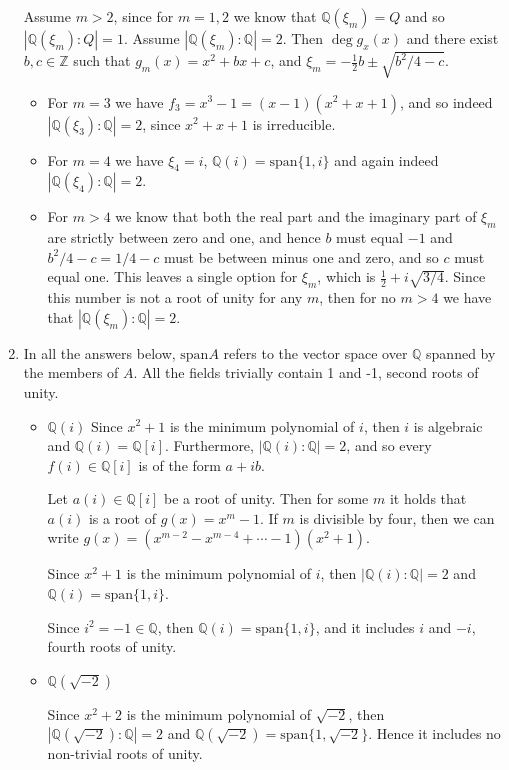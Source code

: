 \documentclass[11pt]{article} \usepackage{amssymb}
\newcommand{\Q}{\mathbb Q}
\newcommand{\Z}{\mathbb Z} \newcommand{\CalE}{{\mathcal{E}}}
\newcommand{\half}{{\textstyle \frac12}}
\begin{document}
\begin{enumerate}
  Assume $m>2$, since for $m=1,2$ we know that $\Q(\xi_m)=Q$ and so 
  $|\Q(\xi_m):Q|=1$.
  Assume $|\Q(\xi_m):\Q|=2$. Then $\deg g_x(x)$ and there exist $b,c \in \Z$ such that
  $g_m(x)=x^2+bx+c$, and $\xi_m=-\half b\pm \sqrt{b^2/4-c}$. 

  \begin{itemize}
  \item For $m=3$ we have $f_3=x^3-1=(x-1)(x^2+x+1)$, and so indeed 
    $|\Q(\xi_3):\Q|=2$, since $x^2+x+1$ is irreducible.
  \item For $m=4$ we have $\xi_4=i$, $\Q(i)=\mbox{span}\{1,i\}$ and again indeed
    $|\Q(\xi_4):\Q|=2$.
  \item For $m>4$ we know that both the real part and the imaginary part
    of $\xi_m$ are strictly between zero and one, and hence $b$ must equal $-1$
    and $b^2/4-c=1/4-c$ must be between minus one and zero, and so $c$
    must equal one. This leaves a single option for $\xi_m$, which is
    $\half+i\sqrt{3/4}$. Since this number is not a root of unity for any
    $m$, then for no $m>4$ we have that $|\Q(\xi_m):\Q|=2$.
  \end{itemize}

  \item 
    In all the answers below, $\mbox{span}A$ refers to the vector space
    over $\Q$ spanned by the members of $A$. All the fields trivially contain
    1 and -1, second roots of unity.
    \begin{itemize}
    \item $\Q(i)$
      Since $x^2+1$ is the minimum polynomial of  $i$, 
      then $i$ is algebraic and $\Q(i)=\Q[i]$. Furthermore, $|\Q(i):\Q|=2$, and so
      every $f(i) \in \Q[i]$ is of the form $a+ib$.

      Let $a(i) \in \Q[i]$ be a root of unity. Then for some $m$ it holds
      that $a(i)$ is a root of $g(x)=x^m-1$. If $m$ is divisible by four, then
      we can write $g(x)=(x^{m-2}-x^{m-4}+\cdots-1)(x^2+1)$. 
      
      Since $x^2+1$ is the minimum polynomial of  $i$, 
      then $|\Q(i):\Q|=2$ and $\Q(i)=\mbox{span}\{1,i\}$. 
      
      Since $i^2=-1\in \Q$, then $\Q(i)=\mbox{span}\{1,i\}$, and it includes 
      $i$ and $-i$, fourth roots of unity.
      
    \item $\Q(\sqrt{-2})$
      
      Since $x^2+2$ is the minimum polynomial of  $\sqrt{-2}$, 
      then $|\Q(\sqrt{-2}):\Q|=2$ and  $\Q(\sqrt{-2})=\mbox{span}\{1,\sqrt{-2}\}$. 
      Hence it includes no non-trivial roots of unity.


\end{itemize}
\end{enumerate}
\end{document}

